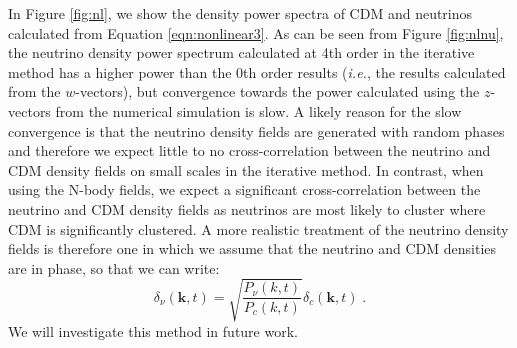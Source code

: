 \documentclass{aastex}
\def \ie {{\it i.e.}, }
\begin{document}
In Figure \ref{fig:nl}, we show the density power spectra of CDM and
neutrinos calculated from Equation \eqref{eqn:nonlinear3}.
As can be seen from Figure \ref{fig:nlnu}, the neutrino density power
spectrum calculated at 4th order in the iterative method has a
 higher power than the 0th order results (\ie the results
calculated from the $w$-vectors), but convergence towards the power
calculated using the $z$-vectors from the numerical simulation is slow.  
A likely reason for the slow convergence is that the
neutrino density fields are generated with random phases and therefore
we expect little to
no cross-correlation between the neutrino and
CDM density fields on small scales in the iterative method.  In contrast, when using the
N-body fields, we expect a significant cross-correlation
between the neutrino and CDM density fields as 
neutrinos are most likely to cluster where CDM is
significantly clustered.  A more realistic treatment of the neutrino
density fields is therefore one in which we assume that the
neutrino and CDM densities 
are in phase, so that we can write:
\begin{equation}
  \delta_\nu(\mathbf{k},t) = \sqrt{ \frac{ P_\nu(k,t)}{P_c(k,t)} } \delta_c(\mathbf{k},t)\;.
\end{equation}
We will investigate this method in future work.
\end{document}
